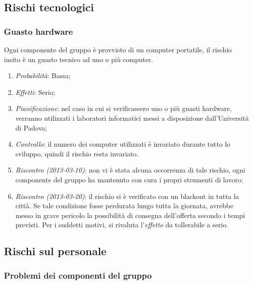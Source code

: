 	\subsection{Rischi tecnologici}
	
		\subsubsection{Guasto hardware}
		
Ogni componente del gruppo è provvisto di un computer portatile, il rischio insito è un guasto tecnico ad uno o più computer.
\begin{enumerate}
\item \textit{Probabilità}: Bassa;
\item \textit{Effetti}: Serio;
\item \textit{Pianificazione}: nel caso in cui si verificassero uno o più guasti hardware, verranno utilizzati i laboratori informatici messi a disposizione dall'Università di Padova;
\item \textit{Controllo}: il numero dei computer utilizzati è invariato durante tutto lo sviluppo, quindi il rischio resta invariato.
\item \textit{Riscontro (2013-03-10)}: non vi è stata alcuna occorrenza di tale rischio, ogni componente del gruppo ha mantenuto con cura i propri strumenti di lavoro;
\item \textit{Riscontro (2013-03-20)}: il rischio si è verificato con un blackout in tutta la città. Se tale condizione fosse perdurata lungo tutta la giornata, avrebbe messo in grave pericolo la possibilità di consegna dell'offerta secondo i tempi previsti. Per i suddetti motivi, si rivaluta l'\emph{effetto} da tollerabile a serio.
\end{enumerate}	
	
	
	\subsection{Rischi sul personale}
		\subsubsection{Problemi dei componenti del gruppo}
		
